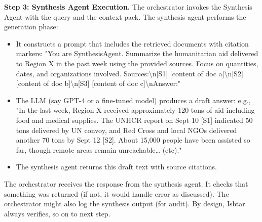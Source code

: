 \textbf{Step 3: Synthesis Agent Execution.} The orchestrator invokes the Synthesis Agent with the query and the context pack. The synthesis agent performs the generation phase:
\begin{itemize}
  \item It constructs a prompt that includes the retrieved documents with citation markers: "You are SynthesisAgent. Summarize the humanitarian aid delivered to Region X in the past week using the provided sources. Focus on quantities, dates, and organizations involved. Sources:\textbackslash n[S1] [content of doc a]\textbackslash n[S2] [content of doc b]\textbackslash n[S3] [content of doc c]\textbackslash nAnswer:"
  \item The LLM (say GPT-4 or a fine-tuned model) produces a draft answer: e.g., "In the last week, Region X received approximately 120 tons of aid including food and medical supplies. The UNHCR report on Sept 10 [S1] indicated 50 tons delivered by UN convoy, and Red Cross and local NGOs delivered another 70 tons by Sept 12 [S2]. About 15{,}000 people have been assisted so far, though remote areas remain unreachable… (etc)."
  \item The synthesis agent returns this draft text with source citations.
\end{itemize}
The orchestrator receives the response from the synthesis agent. It checks that something was returned (if not, it would handle error as discussed). The orchestrator might also log the synthesis output (for audit). By design, Ishtar always verifies, so on to next step.

